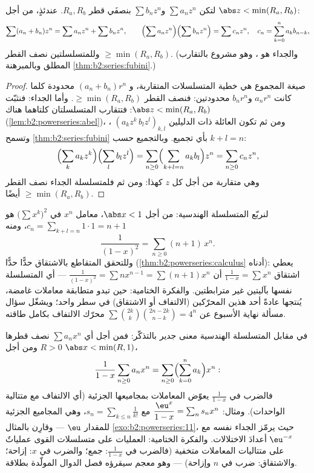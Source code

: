 \begin{proposition}[العمليات]\label{prop:b2:powerseries:operations}
لتكن $\sum a_nz^n$ و$\sum b_nz^n$ بنصفَي قطر $R_a, R_b$. عندئذٍ، من أجل
$\abs z < \min(R_a, R_b)$:
\[
\sum (a_n + b_n)z^n = \sum a_nz^n + \sum b_nz^n,
\qquad
\Bigl(\sum a_nz^n\Bigr)\Bigl(\sum b_nz^n\Bigr) = \sum c_n z^n,
\quad c_n = \sum_{k=0}^{n} a_kb_{n-k},
\]
وللمتسلسلتين نصف القطر $\geq \min(R_a, R_b)$. (والجداء هو
، وهو مشروع بالتقارب المطلق وبالمبرهنة
\cref{thm:b2:series:fubini}.)
\end{proposition}

\begin{proof}
صيغة المجموع هي خطية المتسلسلات المتقاربة، و
$(a_n + b_n)r^n$ محدودة كلما كانت $a_nr^n$ و$b_nr^n$
محدودتين: فنصف القطر $\geq \min(R_a, R_b)$. وأما الجداء: فنثبّت $\abs z
< \min(R_a, R_b)$: فتتقارب المتسلسلتان كلتاهما \emph{}
هناك (\cref{lem:b2:powerseries:abel})، ومن ثم تكون العائلة ذات الدليلين
$(a_kz^k\,b_lz^l)_{k,l}$ ، وتسمح
\cref{thm:b2:series:fubini} بأي تجميع. وبالتجميع حسب $k
+ l = n$:
\[
\Bigl(\sum_k a_kz^k\Bigr)\Bigl(\sum_l b_lz^l\Bigr)
= \sum_{n\geq0}\Bigl(\sum_{k+l=n}a_kb_l\Bigr)z^n
= \sum_{n\geq0}c_nz^n ,
\]
وهي متقاربة  من أجل كل $z$ كهذا: ومن ثم فلمتسلسلة الجداء
نصف القطر $\geq \min(R_a, R_b)$ أيضًا.
\end{proof}

\begin{example}\label{ex:b2:powerseries:cauchysquare}
لنربّع المتسلسلة الهندسية: من أجل $\abs x < 1$، معامل
$x^n$ في $\bigl(\sum x^k\bigr)^2$ هو $c_n = \sum_{k+l=n}
1\cdot1 = n + 1$، ومنه
\[
\frac{1}{(1-x)^2} = \sum_{n\geq0}(n+1)\,x^n .
\]
وللتحقق المتقاطع بالاشتقاق حدًّا حدًّا
(\cref{thm:b2:powerseries:calculus} أدناه): يعطي اشتقاق
$\frac{1}{1-x} = \sum x^n$ أن $\frac{1}{(1-x)^2} = \sum
nx^{n-1} = \sum(n+1)x^n$ --- أي المتسلسلة نفسها بآليتين
غير مترابطتين. والفكرة الختامية: حين تبدو متطابقة معاملات
غامضة، يُنتجها عادةً أحد هذين المحرّكين (الالتفاف أو
الاشتقاق) في سطر واحد؛ ويشغّل سؤال مسألة نهاية الأسبوع عن
$\sum\binom{2k}k\binom{2n-2k}{n-k} = 4^n$ محرّك الالتفاف بكامل طاقته.
\end{example}

\begin{example}\label{ex:b2:powerseries:partialsums}
 في مقابل المتسلسلة الهندسية معنى جدير
بالتذكّر: فمن أجل أي $\sum a_nx^n$ نصف قطرها $R > 0$ ومن أجل $\abs x <
\min(R, 1)$،
\[
\frac{1}{1-x}\sum_{n\geq0}a_nx^n
= \sum_{n\geq0}\Bigl(\sum_{k=0}^{n}a_k\Bigr)x^n :
\]
فالضرب في $\frac{1}{1-x}$ يعوّض المعاملات
بمجاميعها الجزئية (أي الالتفاف مع متتالية الواحدات).
ومثال: $\dfrac{\eu^x}{1-x} = \sum_n s_n x^n$ مع $s_n =
\sum_{k\leq n}\frac{1}{k!}$، وهي المجاميع الجزئية للمقدار $\eu$ ---
وقارِن بالمثال \cref{exo:b2:powerseries:11}، حيث يرمّز الجداء نفسه
مع $\eu^{-x}$ أعدادَ الاختلالات. والفكرة الختامية: العمليات على متسلسلات
القوى عملياتٌ على متتاليات المعاملات متخفية (فالضرب في $\frac1{1-x}$:
جمع؛ والضرب في $x$: إزاحة؛ والاشتقاق: ضرب في $n$
وإزاحة) --- وهو معجم سيقرؤه فصل الدوال المولّدة
بطلاقة.
\end{example}

